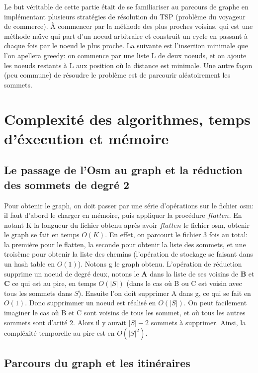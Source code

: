 \documentclass[french]{article}
\begin{document}
Le but véritable de cette partie était de se familiariser au parcours de graphe en implémentant plusieurs stratégies de résolution du TSP (problème du voyageur de commerce). À commencer par la méthode des plus proches voisins, qui est une méthode na\"\i ve qui part d'un noeud arbitraire et construit un cycle en passant à chaque fois par le noeud le plus proche. La suivante est l'insertion minimale que l'on apellera greedy: on commence par une liste L de deux noeuds, et on ajoute les noeuds restants à L aux position où la distance est minimale. Une autre façon (peu commune) de résoudre le problème est de parcourir aléatoirement les sommets. \newline

\newpage
\section{Complexité des algorithmes, temps d'éxecution et mémoire}
\subsection{Le passage de l'Osm au graph et la réduction des sommets de degré 2}
Pour obtenir le graph, on doit passer par une série d'opérations sur le fichier osm: il faut d'abord le charger en mémoire, puis appliquer la procédure $flatten$. En notant K la longueur du fichier obtenu après avoir $flatten$ le fichier osm, obtenir le graph se fait en temps $O(K)$. En effet, on parcourt le fichier 3 fois au total: la première pour le flatten, la seconde pour obtenir la liste des sommets, et une troisème pour obtenir la liste des chemins (l'opération de stockage se faisant dans un hash table en $O(1)$).\newline
Notons g le graph obtenu. L'opération de réduction supprime un noeud de degré deux, notons le \textbf{A} dans la liste de ses voisins de \textbf{B} et \textbf{C} ce qui est au pire, en temps $O(\vert S\vert)$ (dans le cas où B ou C est voisin avec tous les sommets dans $S$). Ensuite l'on doit supprimer A dans g, ce qui se fait en $O(1)$. Donc supprimmer un noeud est réalisé en $O(\vert S\vert)$. On peut facilement imaginer le cas où B et C sont voisins de tous les sommet, et où tous les autres sommets sont d'arité 2. Alors il y aurait $\vert S\vert -2$ sommets à supprimer. Ainsi, la compléxité temporelle au pire est en $O(\vert S\vert^2)$.


\subsection{Parcours du graph et les itinéraires} 
\end{document}
